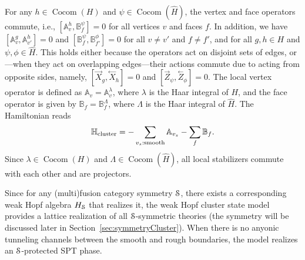 \documentclass[a4paper,11pt]{article}
\theoremstyle{theorem}
\theoremstyle{remark}
\newcommand\eS         {\EuScript{S}}
\newcommand{\Av}{\mathbb{A}}
\newcommand{\Bf}{\mathbb{B}}
\newcommand{\Hbb}{\mathbb{H}}
\newcommand{\XR}{\overset{\rightarrow}{X}}
\newcommand{\XL}{\overset{\leftarrow}{X}}
\newcommand{\ZR}{\overset{\rightarrow}{Z}}
\newcommand{\ZL}{\overset{\leftarrow}{Z}}
\newcommand{\Cocom}{\operatorname{Cocom}}
\begin{document}
For any $h \in \Cocom(H)$ and $\psi \in \Cocom(\hat{H})$, the vertex and face operators commute, i.e., $[\Av_v^{h}, \Bf_f^{\psi}] = 0$ for all vertices $v$ and faces $f$. In addition, we have $[\Av_v^g, \Av_{v'}^h] = 0$ and $[\Bf_f^{\psi}, \Bf_{f'}^{\phi}] = 0$ for all $v \neq v'$ and $f \neq f'$, and for all $g, h \in H$ and $\psi, \phi \in \hat{H}$. This holds either because the operators act on disjoint sets of edges, or—when they act on overlapping edges—their actions commute due to acting from opposite sides, namely, $[\XR_g, \XL_h] = 0$ and $[\ZR_\psi, \ZL_\phi] = 0$.
The local vertex operator is defined as $\Av_v = \Av_v^{\lambda}$, where $\lambda$ is the Haar integral of $H$, and the face operator is given by $\Bf_f = \Bf_f^{\Lambda}$, where $\Lambda$ is the Haar integral of $\hat{H}$.
The Hamiltonian reads
\begin{equation}\label{eq:ClusterStateModel}
    \Hbb_{\rm cluster} = -\sum_{v_s: \text{smooth}} \Av_{v_s} - \sum_f \Bf_f.
\end{equation}
Since $\lambda \in \Cocom(H)$ and $\Lambda \in \Cocom(\hat{H})$, all local stabilizers commute with each other and are projectors.



Since for any (multi)fusion category symmetry $\eS$, there exists a corresponding weak Hopf algebra $H_{\eS}$ that realizes it, the weak Hopf cluster state model provides a lattice realization of all $\eS$-symmetric theories (the symmetry will be discussed later in Section~\ref{sec:symmetryCluster}). 
When there is no anyonic tunneling channels between the smooth and rough boundaries, the model realizes an $\eS$-protected SPT phase.
\end{document}
